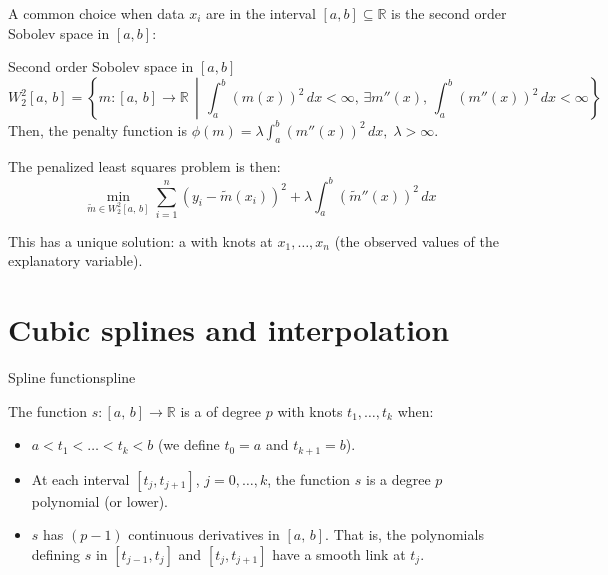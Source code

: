 A common choice when data $x_i$ are in the interval $[a,b] \subseteq \mathbb{R}$ is
the second order Sobolev space in $[a,b]$:
\begin{definition}{Second order Sobolev space}{} in $[a, b]$
    \begin{equation*}
        W_2^2[a,\,b] = \left\{
            m : [a,\,b] \to \mathbb{R} \,\middle|\,
            \int_a^b \left(m(x)\right)^2 \,dx < \infty,\,
            \exists m''(x),\,
            \int_a^b \left(m''(x)\right)^2 \,dx < \infty
            \right\}
    \end{equation*}
    \tcbline
    Then, the penalty function is $\phi(m) = \lambda \int_a^b \left(m''(x)\right)^2 \,dx,\;\lambda > \infty$.

    The penalized least squares problem is then:
    \begin{equation*}
        \min_{\tilde m \in W_2^2[a,\,b]}
        \sum_{i=1}^n \left(y_i - \tilde m(x_i)\right)^2
        + \lambda \int_a^b \left(\tilde m''(x)\right)^2 \,dx
    \end{equation*}

    This has a unique solution: a  with knots at $x_1,\ldots,x_n$
    (the observed values of the explanatory variable).
\end{definition}


\section[Cubic splines interpolation]{Cubic splines and interpolation}

\begin{definition}{Spline function}{spline}

    The function $s : [a,\,b] \to \mathbb{R}$ is a  of
    degree $p$ with knots $t_1, \ldots, t_k$ when:
    \begin{itemize}
        \item $a < t_1 < \ldots < t_k < b$ (we define $t_0 = a$ and $t_{k+1} = b$).
        \item At each interval $[t_j, t_{j+1}]$, $j=0,\ldots,k$, the function $s$ is
            a degree $p$ polynomial (or lower).
        \item $s$ has $(p-1)$ continuous derivatives in $[a,\,b]$. That is,
            the polynomials defining $s$ in $[t_{j-1}, t_{j}]$ and $[t_j, t_{j+1}]$
            have a smooth link at $t_j$.
    \end{itemize}
\end{definition}

